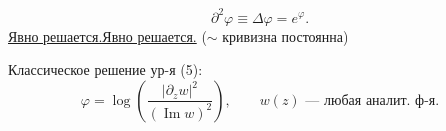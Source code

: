 \documentclass[11pt]{article}
\theoremstyle{definition}
\theoremstyle{remark}
\let\DiplomaticMathUnderline\underline
\renewcommand{\underline}[1]{\ifmmode\DiplomaticMathUnderline{#1}\else\uline{#1}\fi}
\begin{document}

\begin{equation*}
\partial^2\varphi\equiv\Delta\varphi=e^\varphi.\tag{5}
\end{equation*}
\underline{Явно решается.} ($\sim$ кривизна постоянна)

Классическое решение ур-я (5):
\begin{equation*}
\varphi=\log\left(\frac{|\partial_z w|^2}{(\operatorname{Im}w)^2}\right),
\qquad w(z)\text{ — любая аналит. ф-я}.\tag{6}
\end{equation*}
\end{document}

